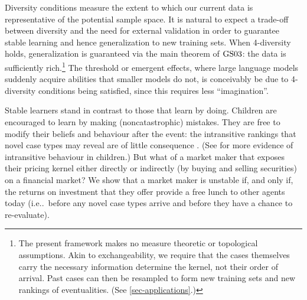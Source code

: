 \documentclass[ecta,nameyear,draft]{econsocart}
\makeatletter
\newcommand\ie{i\@.e\@ifnextchar.{}{.\@}}
\newcommand{\gsii}{$\textup{GS03}$}
\theoremstyle{plain}
\theoremstyle{remark}
\makeatother
\begin{document}
Diversity conditions measure the extent to which our current data is
representative of the potential sample space. It is natural to expect a
trade-off between diversity and the need for external validation in order to
guarantee stable learning and hence generalization to new training sets. When
4-diversity holds, generalization is guaranteed via the main theorem of \gsii:
the data is sufficiently rich.\footnote{The present framework makes no measure
  theoretic or topological assumptions. Akin to exchangeability, we require
  that the cases themselves carry the necessary information determine the
  kernel, not their order of arrival. Past cases can then be resampled to form
  new training sets and new rankings of eventualities. (See
\cref{sec-applications}.)} The threshold or emergent effects, where large
language models suddenly acquire abilities that smaller models do not, is
conceivably be due to 4-diversity conditions being satisfied, since this
requires less ``imagination''.

Stable learners stand in contrast to those that learn by doing. Children are
encouraged to learn by making (noncatastrophic) mistakes. They are free to
modify their beliefs and behaviour after the event: the intransitive rankings
that novel case types may reveal are of little consequence
\citep{bradbury1990effects}. (See
\citep{weinstein1968transitivity,bradbury1974transitivity} for more evidence of
intransitive behaviour in children.) But what of a market maker that exposes
their pricing kernel either directly or indirectly (by buying and selling
securities) on a financial market? We show that a market maker is unstable if,
and only if, the returns on investment that they offer provide a free lunch to
other agents today (\ie\ before any novel case types arrive and before they
have a chance to re-evaluate).
\end{document}
